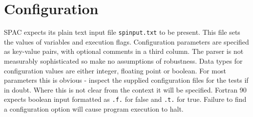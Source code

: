 
\section{Configuration}

SPAC expects its plain text  input file \texttt{spinput.txt} to be present.
This file sets the values of variables and execution flags. Configuration
parameters are specified as key-value pairs, with optional comments in a third
column. The parser is not measurably sophisticated so make no assumptions of
robustness. Data types for configuration values are either integer, floating
point or boolean. For most parameters this is obvious - inspect the supplied
configuration files for the tests if in doubt. Where this is not clear from the
context it will be specified. Fortran 90 expects boolean input formatted as
\texttt{.f.} for false and \texttt{.t.} for true. Failure to find a
configuration option will cause program execution to halt.

